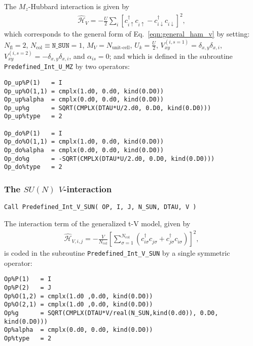 The $M_z$-Hubbard interaction is given by 
\begin{align}
\hat{\mathcal{H}}_{V} = - \frac{U}{2}\sum\limits_{i}\left[
c^{\dagger}_{i \uparrow} c^{\phantom\dagger}_{i \uparrow}  -   c^{\dagger}_{i \downarrow} c^{\phantom\dagger}_{i \downarrow}  \right]^{2},
\end{align} 
which corresponds to the general form of Eq.~\eqref{eqn:general_ham_v} by setting: 
$N_{\mathrm{fl}} = 2$, $N_{\mathrm{col}} \equiv \texttt{N\_SUN} =1 $,  $M_V =  N_{\text{unit-cell}} $,  $U_{k} = \frac{U}{2}$, 
$V_{x y}^{(i, s=1)} =  \delta_{x,y} \delta_{x,i}  $,  $V_{x y}^{(i, s=2)} =  - \delta_{x,y} \delta_{x,i}  $, and $\alpha_{is}   = 0  $; and which is defined in the subroutine \texttt{Predefined\_Int\_U\_MZ} by two operators:
\begin{lstlisting}[style=fortran]
Op_up%P(1)   = I
Op_up%O(1,1) = cmplx(1.d0, 0.d0, kind(0.D0))
Op_up%alpha  = cmplx(0.d0, 0.d0, kind(0.D0))
Op_up%g      = SQRT(CMPLX(DTAU*U/2.d0, 0.D0, kind(0.D0))) 
Op_up%type   = 2

Op_do%P(1)   = I
Op_do%O(1,1) = cmplx(1.d0, 0.d0, kind(0.D0))
Op_do%alpha  = cmplx(0.d0, 0.d0, kind(0.D0))
Op_do%g      = -SQRT(CMPLX(DTAU*U/2.d0, 0.D0, kind(0.D0))) 
Op_do%type   = 2

\end{lstlisting}


\subsubsection{The $SU(N)$ $V$-interaction}

\begin{lstlisting}[style=fortran]
Call Predefined_Int_V_SUN( OP, I, J, N_SUN, DTAU, V )
\end{lstlisting}

The interaction term of the generalized t-V model, given by 
\begin{align}
\hat{\mathcal{H}}_{V,i,j} =
-\frac{V}{N_\mathrm{col}}\left[ \sum_{\sigma=1}^{N_\mathrm{col}}\left( c^{\dagger}_{i \sigma} c^{\phantom\dagger}_{j \sigma} + c^{\dagger}_{j \sigma} c^{\phantom\dagger}_{i \sigma} \right) \right]^2,
\end{align} 
is coded in the subroutine \texttt{Predefined\_Int\_V\_SUN} by a single symmetric operator:
\begin{lstlisting}[style=fortran]
Op%P(1)   = I
Op%P(2)   = J
Op%O(1,2) = cmplx(1.d0 ,0.d0, kind(0.D0)) 
Op%O(2,1) = cmplx(1.d0 ,0.d0, kind(0.D0))
Op%g      = SQRT(CMPLX(DTAU*V/real(N_SUN,kind(0.d0)), 0.D0, kind(0.D0))) 
Op%alpha  = cmplx(0.d0, 0.d0, kind(0.D0))
Op%type   = 2

\end{lstlisting}



